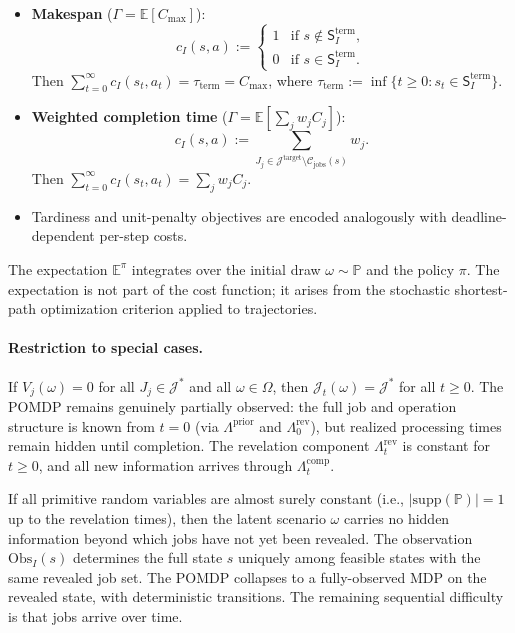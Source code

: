 \begin{itemize}
    \item \textbf{Makespan} ($\Gamma = \mathbb{E}[C_{\max}]$):
    \[
    c_I(s, a) := \begin{cases} 1 & \text{if } s \notin \mathsf{S}_I^{\mathrm{term}},
    \\ 0 & \text{if } s \in \mathsf{S}_I^{\mathrm{term}}. \end{cases}
    \]
    Then
    $\sum_{t=0}^{\infty} c_I(s_t, a_t) = \tau_{\mathrm{term}} = C_{\max}$, where
    $\tau_{\mathrm{term}} := \inf\{t \ge 0 : s_t \in \mathsf{S}_I^{\mathrm{term}}\}$.

    \item \textbf{Weighted completion time}
    ($\Gamma = \mathbb{E}[\sum_j w_j C_j]$):
    \[
    c_I(s, a) := \sum_{J_j \in \mathcal{J}^{\mathrm{target}} \setminus
    \mathcal{C}_{\mathrm{jobs}}(s)} w_j.
    \]
    Then $\sum_{t=0}^{\infty} c_I(s_t, a_t) = \sum_j w_j C_j$.

    \item Tardiness and unit-penalty objectives are encoded analogously with
    deadline-dependent per-step costs.
\end{itemize}

The expectation $\mathbb{E}^{\pi}$ integrates over the initial draw
$\omega \sim \mathbb{P}$ and the policy $\pi$. The expectation is not part of
the cost function; it arises from the stochastic shortest-path optimization criterion
applied to trajectories.

\paragraph{Restriction to special cases.}

\begin{remark}
If $V_j(\omega) = 0$ for all $J_j \in \mathcal{J}^*$ and all $\omega \in \Omega$, then
$\mathcal{J}_t(\omega) = \mathcal{J}^*$ for all $t \ge 0$. The POMDP remains genuinely
partially observed: the full job and operation structure is known from $t = 0$ (via
$\Lambda^{\mathrm{prior}}$ and $\Lambda_0^{\mathrm{rev}}$), but realized processing
times remain hidden until completion. The revelation component
$\Lambda_t^{\mathrm{rev}}$ is constant for $t \ge 0$, and all new information arrives
through $\Lambda_t^{\mathrm{comp}}$.
\end{remark}

\begin{remark}
If all primitive random variables are almost surely constant (i.e.,
$|\mathrm{supp}(\mathbb{P})| = 1$ up to the revelation times), then the latent scenario
$\omega$ carries no hidden information beyond which jobs have not yet been revealed.
The observation $\mathrm{Obs}_I(s)$ determines the full state $s$ uniquely among
feasible states with the same revealed job set. The POMDP collapses to a fully-observed
MDP on the revealed state, with deterministic transitions. The remaining sequential
difficulty is that jobs arrive over time.
\end{remark}

